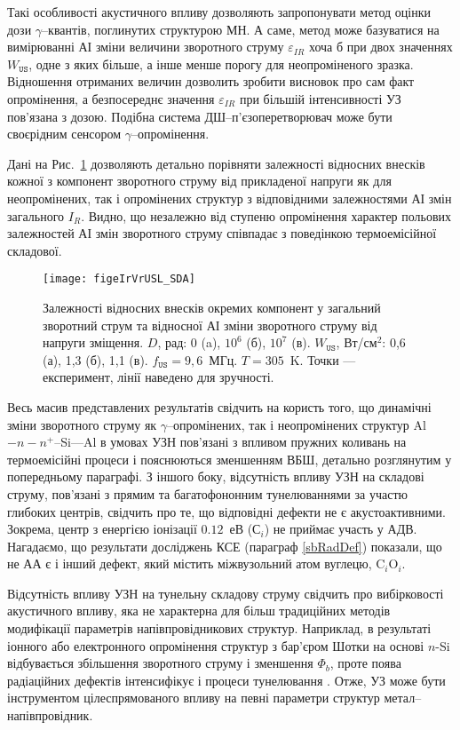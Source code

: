 Такі особливості акустичного впливу дозволяють запропонувати метод оцінки дози $\gamma$--квантів, поглинутих структурою МН.
А саме, метод може базуватися на вимірюванні АІ зміни величини зворотного струму $\varepsilon_{IR}$ хоча б при двох значеннях $W_\mathtt{US}$,
одне з яких більше, а інше менше порогу для неопроміненого зразка.
Відношення отриманих величин дозволить зробити висновок про сам факт опромінення,
а безпосереднє значення $\varepsilon_{IR}$ при більшій інтенсивності УЗ пов’язана з дозою.
Подібна система ДШ--п’єзоперетворювач може бути своєрідним сенсором $\gamma$--опромінення.

Дані на Рис.~\ref{figeIrVrUSL_SDA} дозволяють детально порівняти залежності відносних внесків кожної з компонент зворотного струму від прикладеної напруги
як для неопромінених, так і опромінених структур з відповідними залежностями АІ змін загального $I_R$.
Видно, що незалежно від ступеню опромінення характер польових залежностей АІ змін зворотного струму співпадає з поведінкою термоемісійної складової.


\begin{figure}
\center
\texttt{[image: figeIrVrUSL\_SDA]}
\caption{\label{figeIrVrUSL_SDA}
Залежності відносних внесків окремих компонент у загальний зворотний струм
та відносної АІ зміни зворотного струму від напруги зміщення.
$D$, рад: 0 (a), $10^6$ (б), $10^7$ (в).
$W_\mathtt{US}$, Вт/см$^2$: 0,6 (а), 1,3 (б), 1,1 (в).
$f_\mathtt{US}=9,6$~МГц.
$T=305$~K.
Точки --- експеримент,
лінії наведено для зручності.
}%
\end{figure}


Весь масив представлених результатів свідчить на користь того, що
динамічні зміни зворотного струму як $\gamma$--опромінених, так і неопромінених структур Al$-n-n^+$--Si---Al в умовах УЗН
пов’язані з впливом пружних коливань на термоемісійні процеси і пояснюються зменшенням ВБШ, детально розглянутим у попередньому параграфі.
З іншого боку, відсутність впливу УЗН на складові струму, пов’язані з прямим та багатофононним тунелюваннями за участю глибоких центрів,
свідчить про те, що відповідні дефекти не є акустоактивними.
Зокрема, центр з енергією іонізації $0.12$~еВ (С$_i$) не приймає участь у АДВ.
Нагадаємо, що результати досліджень КСЕ (параграф \ref{sbRadDef}) показали, що не АА є і інший дефект, який містить міжвузольний атом вуглецю, C$_i$O$_i$.

Відсутність впливу УЗН на тунельну складову струму свідчить про вибірковості акустичного впливу, яка не характерна для більш традиційних методів модифікації параметрів напівпровідникових структур.
Наприклад, в результаті іонного або електронного опромінення структур з бар'єром Шотки на основі $n$-Si відбувається збільшення зворотного струму
і зменшення $\Phi_b$,
проте поява радіаційних дефектів інтенсифікує і процеси тунелювання \cite{Kumar2,Rao,SINGH2001}.
Отже, УЗ може бути інструментом цілеспрямованого впливу на певні параметри структур метал--напівпровідник.


